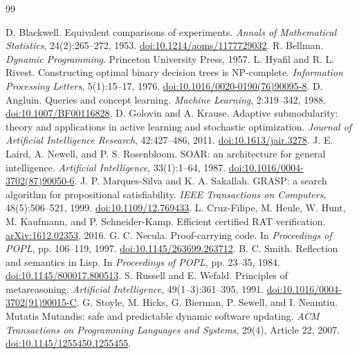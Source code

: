 \documentclass[10pt,letterpaper]{article}
\begin{document}
\begin{thebibliography}{99}
\small\raggedright
{} D. Blackwell. Equivalent comparisons of experiments. \emph{Annals of Mathematical Statistics}, 24(2):265--272, 1953. \href{https://doi.org/10.1214/aoms/1177729032}{doi:10.1214/aoms/1177729032}.
 R. Bellman. \emph{Dynamic Programming}. Princeton University Press, 1957.
 L. Hyafil and R. L. Rivest. Constructing optimal binary decision trees is NP-complete. \emph{Information Processing Letters}, 5(1):15--17, 1976. \href{https://doi.org/10.1016/0020-0190(76)90095-8}{doi:10.1016/0020-0190(76)90095-8}.
 D. Angluin. Queries and concept learning. \emph{Machine Learning}, 2:319--342, 1988. \href{https://doi.org/10.1007/BF00116828}{doi:10.1007/BF00116828}.
 D. Golovin and A. Krause. Adaptive submodularity: theory and applications in active learning and stochastic optimization. \emph{Journal of Artificial Intelligence Research}, 42:427--486, 2011. \href{https://doi.org/10.1613/jair.3278}{doi:10.1613/jair.3278}.
 J. E. Laird, A. Newell, and P. S. Rosenbloom. SOAR: an architecture for general intelligence. \emph{Artificial Intelligence}, 33(1):1--64, 1987. \href{https://doi.org/10.1016/0004-3702(87)90050-6}{doi:10.1016/0004-3702(87)90050-6}.
 J. P. Marques-Silva and K. A. Sakallah. GRASP: a search algorithm for propositional satisfiability. \emph{IEEE Transactions on Computers}, 48(5):506--521, 1999. \href{https://doi.org/10.1109/12.769433}{doi:10.1109/12.769433}.
 L. Cruz-Filipe, M. Heule, W. Hunt, M. Kaufmann, and P. Schneider-Kamp. Efficient certified RAT verification. \href{https://arxiv.org/abs/1612.02353}{\textnormal{arXiv:1612.02353}}, 2016.
 G. C. Necula. Proof-carrying code. In \emph{Proceedings of POPL}, pp. 106--119, 1997. \href{https://doi.org/10.1145/263699.263712}{doi:10.1145/263699.263712}.
 B. C. Smith. Reflection and semantics in Lisp. In \emph{Proceedings of POPL}, pp. 23--35, 1984. \href{https://doi.org/10.1145/800017.800513}{doi:10.1145/800017.800513}.
 S. Russell and E. Wefald. Principles of metareasoning. \emph{Artificial Intelligence}, 49(1--3):361--395, 1991. \href{https://doi.org/10.1016/0004-3702(91)90015-C}{doi:10.1016/0004-3702(91)90015-C}.
 G. Stoyle, M. Hicks, G. Bierman, P. Sewell, and I. Neamtiu. Mutatis Mutandis: safe and predictable dynamic software updating. \emph{ACM Transactions on Programming Languages and Systems}, 29(4), Article 22, 2007. \href{https://doi.org/10.1145/1255450.1255455}{doi:10.1145/1255450.1255455}.

\end{thebibliography}
\end{document}
